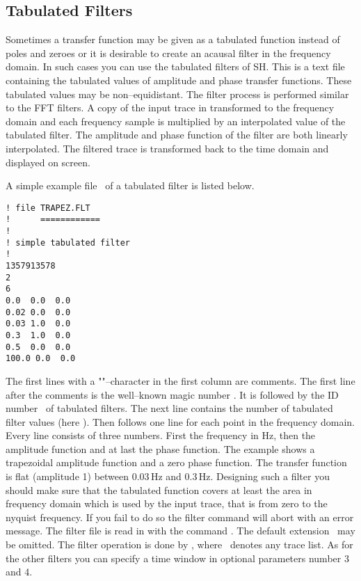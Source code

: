 \subsection{Tabulated Filters}

Sometimes a transfer function may be given as a tabulated function
instead of poles and zeroes or it is desirable to create an
acausal filter in the frequency domain.  In such cases you can
use the tabulated filters of SH.  This is a text file containing
the tabulated values of amplitude and phase transfer functions.
These tabulated values may be non--equidistant.
The filter process is performed similar to the FFT filters.
A copy of the input trace in transformed to the frequency domain
and each frequency sample is multiplied by an interpolated value
of the tabulated filter.  The amplitude and phase function of
the filter are both linearly interpolated.  The filtered trace
is transformed back to the time domain and displayed on screen.

A simple example file \ of a tabulated filter
is listed below.

\begin{verbatim}
! file TRAPEZ.FLT
!      ============
!
! simple tabulated filter
!
1357913578
2
6
0.0  0.0  0.0
0.02 0.0  0.0
0.03 1.0  0.0
0.3  1.0  0.0
0.5  0.0  0.0
100.0 0.0  0.0
\end{verbatim}

The first lines with a "\exm{!}"--character in the first column
are comments.  The first line after the comments is the well--known
magic number .  It is followed by the ID number
\ of tabulated filters.  The next line contains the number
of tabulated filter values (here ).  Then follows one line
for each point in the frequency domain.  Every line consists of
three numbers.  First the frequency in Hz, then the amplitude
function and at last the phase function.  The example shows a
trapezoidal amplitude function and a zero phase function.  The
transfer function is flat (amplitude 1) between 0.03\,Hz and 0.3\,Hz.
Designing such a filter you should make sure that the tabulated
function covers at least the area in frequency domain which is
used by the input trace, that is from zero to the nyquist
frequency.  If you fail to do so the filter command will abort
with an error message.  The filter file is read in with the
command .  The default extension \
may be omitted.  The filter operation is done by ,
where \cmd{<list>}\ denotes any trace list.  As for the other filters
you can specify a time window in optional parameters number 3 and 4.


